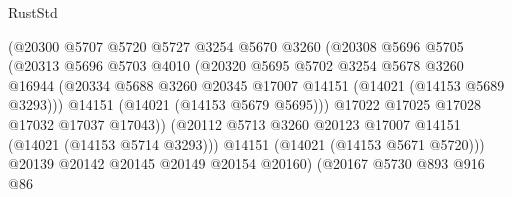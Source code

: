 \begin{lexlean}{RustStd}
\begin{coremodule}
                                  (@20300
                                    @5707
                                    @5720
                                    @5727
                                    @3254
                                    @5670
                                    @3260
                                    (@20308
                                      @5696
                                      @5705
                                      (@20313
                                        @5696
                                        @5703
                                        @4010
                                        (@20320
                                          @5695
                                          @5702
                                          @3254
                                          @5678
                                          @3260
                                          @16944
                                          (@20334
                                            @5688
                                            @3260
                                            @20345
                                            @17007
                                            @14151
                                            (@14021 (@14153 @5689 @3293)))
                                          @14151
                                          (@14021 (@14153 @5679 @5695)))
                                        @17022
                                        @17025
                                        @17028
                                        @17032
                                        @17037
                                        @17043))
                                    (@20112
                                      @5713
                                      @3260
                                      @20123
                                      @17007
                                      @14151
                                      (@14021 (@14153 @5714 @3293)))
                                    @14151
                                    (@14021 (@14153 @5671 @5720)))
                                  @20139
                                  @20142
                                  @20145
                                  @20149
                                  @20154
                                  @20160)
                                (@20167
                                  @5730
                                  @893
                                  @916
                                  @86

\end{coremodule}
\end{lexlean}
